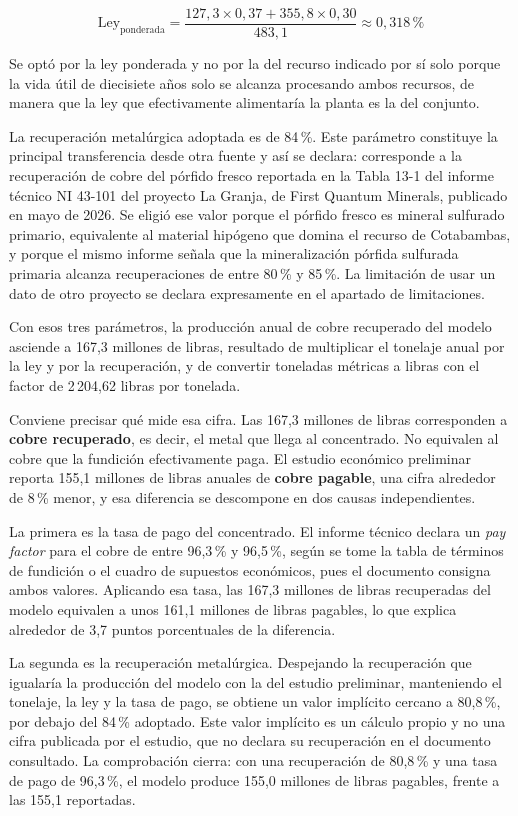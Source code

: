 \begin{equation}
\text{Ley}_{\text{ponderada}} =
\frac{127{,}3 \times 0{,}37 + 355{,}8 \times 0{,}30}{483{,}1} \approx 0{,}318\,\%
\end{equation}

Se optó por la ley ponderada y no por la del recurso indicado por sí solo porque
la vida útil de diecisiete años solo se alcanza procesando ambos recursos, de
manera que la ley que efectivamente alimentaría la planta es la del conjunto.

La recuperación metalúrgica adoptada es de 84\,\%. Este parámetro constituye la
principal transferencia desde otra fuente y así se declara: corresponde a la
recuperación de cobre del pórfido fresco reportada en la Tabla 13-1 del informe
técnico NI 43-101 del proyecto La Granja, de First Quantum Minerals, publicado en
mayo de 2026. Se eligió ese valor porque el pórfido fresco es mineral sulfurado
primario, equivalente al material hipógeno que domina el recurso de Cotabambas, y
porque el mismo informe señala que la mineralización pórfida sulfurada primaria
alcanza recuperaciones de entre 80\,\% y 85\,\%. La limitación de usar un dato de
otro proyecto se declara expresamente en el apartado de limitaciones.

Con esos tres parámetros, la producción anual de cobre recuperado del modelo
asciende a 167,3 millones de libras, resultado de multiplicar el tonelaje anual
por la ley y por la recuperación, y de convertir toneladas métricas a libras con
el factor de 2\,204,62 libras por tonelada.

Conviene precisar qué mide esa cifra. Las 167,3 millones de libras corresponden a
\textbf{cobre recuperado}, es decir, el metal que llega al concentrado. No equivalen al
cobre que la fundición efectivamente paga. El estudio económico preliminar reporta
155,1 millones de libras anuales de \textbf{cobre pagable}, una cifra alrededor de
8\,\% menor, y esa diferencia se descompone en dos causas independientes.

La primera es la tasa de pago del concentrado. El informe técnico declara un
\emph{pay factor} para el cobre de entre 96,3\,\% y 96,5\,\%, según se tome la tabla de
términos de fundición o el cuadro de supuestos económicos, pues el documento consigna
ambos valores. Aplicando esa tasa, las 167,3 millones de libras recuperadas del modelo
equivalen a unos 161,1 millones de libras pagables, lo que explica alrededor de
3,7 puntos porcentuales de la diferencia.

La segunda es la recuperación metalúrgica. Despejando la recuperación que igualaría la
producción del modelo con la del estudio preliminar, manteniendo el tonelaje, la ley y
la tasa de pago, se obtiene un valor implícito cercano a 80,8\,\%, por debajo del 84\,\%
adoptado. Este valor implícito es un cálculo propio y no una cifra publicada por el
estudio, que no declara su recuperación en el documento consultado. La comprobación
cierra: con una recuperación de 80,8\,\% y una tasa de pago de 96,3\,\%, el modelo
produce 155,0 millones de libras pagables, frente a las 155,1 reportadas.

